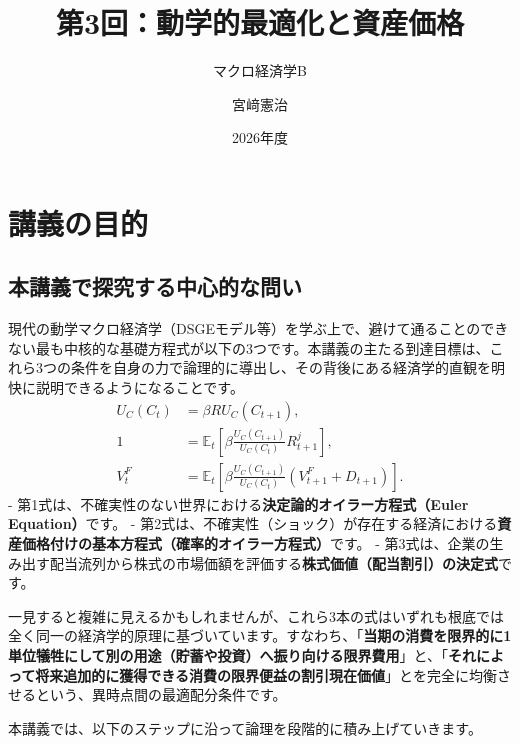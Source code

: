 \documentclass[
  japanese,
  lualatex,
  ja=standard,
  12pt,
  a4paper]{ltjsarticle}
\title{第3回：動学的最適化と資産価格}
\subtitle{マクロ経済学B}
\author{宮﨑憲治}
\date{2026年度}
\renewcommand*\contentsname{目次}
\newcommand\contentsname{目次}
\begin{document}
\maketitle

\renewcommand*\contentsname{目次}
{
\setcounter{tocdepth}{3}
\tableofcontents
}

\section{講義の目的}\label{ux8b1bux7fa9ux306eux76eeux7684}

\subsection{本講義で探究する中心的な問い}\label{ux672cux8b1bux7fa9ux3067ux63a2ux7a76ux3059ux308bux4e2dux5fc3ux7684ux306aux554fux3044}

現代の動学マクロ経済学（DSGEモデル等）を学ぶ上で、避けて通ることのできない最も中核的な基礎方程式が以下の3つです。本講義の主たる到達目標は、これら3つの条件を自身の力で論理的に導出し、その背後にある経済学的直観を明快に説明できるようになることです。
\[
\begin{aligned}
U_C(C_t) &= \beta R U_C(C_{t+1}),\\
1 &= \mathbb{E}_t \left[ \beta \frac{U_C(C_{t+1})}{U_C(C_t)} R^j_{t+1} \right],\\
V_t^F &= \mathbb{E}_t \left[ \beta \frac{U_C(C_{t+1})}{U_C(C_t)} \left( V_{t+1}^F + D_{t+1} \right) \right].
\end{aligned}
\] -
第1式は、不確実性のない世界における\textbf{決定論的オイラー方程式（Euler
Equation）}です。 -
第2式は、不確実性（ショック）が存在する経済における\textbf{資産価格付けの基本方程式（確率的オイラー方程式）}です。
-
第3式は、企業の生み出す配当流列から株式の市場価額を評価する\textbf{株式価値（配当割引）の決定式}です。

一見すると複雑に見えるかもしれませんが、これら3本の式はいずれも根底では全く同一の経済学的原理に基づいています。すなわち、「\textbf{当期の消費を限界的に1単位犠牲にして別の用途（貯蓄や投資）へ振り向ける限界費用}」と、「\textbf{それによって将来追加的に獲得できる消費の限界便益の割引現在価値}」とを完全に均衡させるという、異時点間の最適配分条件です。

本講義では、以下のステップに沿って論理を段階的に積み上げていきます。
\end{document}
